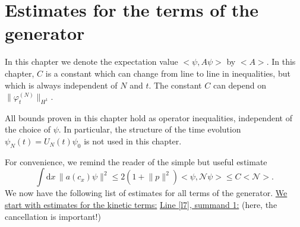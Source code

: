 \documentclass[11pt,a4paper]{scrartcl}
\newcommand{\di}{\textrm{d}}		%
\newcommand{\Ncal}{\mathcal{N}}		%
\newcommand{\estlist}[2]{\underline{Line \ref{l#1}, summand #2:}}
\newcommand{\scal}[2]{\big<#1,#2\big>} %
\newcommand{\norm}[1]{\lVert#1\rVert}	%
\newcommand{\ev}[1]{\big<#1\big>}	%
\newcommand{\ph}{\varphi_t^{(N)}}	%
\newcommand{\bd}{\begin{displaymath}}			%
\newcommand{\ed}{\end{displaymath}}
\begin{document}
\section{Estimates for the terms of the generator}
\label{ch:generatorestimates}
In this chapter we denote the expectation value $\scal{\psi}{A\psi}$ by $\ev{A}$. In this chapter, $C$ is a constant which can change from line to line in inequalities, but which is always independent of $N$ and $t$. The constant $C$ can depend on $\norm{\ph}_{H^1}$.

All bounds proven in this chapter hold as operator inequalities, independent of the choice of $\psi$. In particular, the structure of the time evolution $\psi_N(t) = U_N(t)\psi_0$ is not used in this chapter.

For convenience, we remind the reader of the simple but useful estimate
\bd
\int \di x\, \norm{a(c_x)\psi}^2 \leq 2(1+\norm{p}^2)\scal{\psi}{\Ncal\psi} \leq C\ev{\Ncal}.
\ed
We now have the following list of estimates for all terms of the generator.\newline
\underline{We start with estimates for the kinetic terms:}\newline
\estlist{7}{1} (here, the cancellation is important!)
\end{document}
